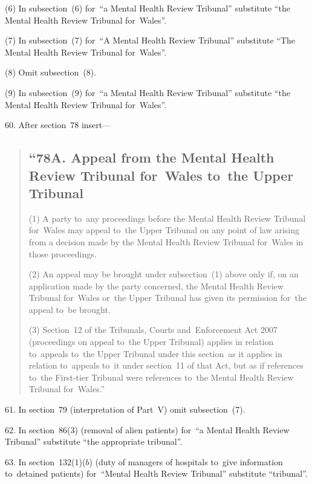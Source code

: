 \documentclass[12pt,a4paper]{article}
\begin{document}
(6) In subsection~(6) for~“a Mental Health Review Tribunal” substitute “the Mental Health Review Tribunal for~Wales”.

(7) In subsection~(7) for~“A Mental Health Review Tribunal” substitute “The Mental Health Review Tribunal for~Wales”.

(8) Omit subsection~(8).

(9) In subsection~(9) for~“a Mental Health Review Tribunal” substitute “the Mental Health Review Tribunal for~Wales”.

\medskip

60.  After section~78 insert—
\begin{quotation}
\subsection*{“78A. Appeal from the Mental Health Review Tribunal for~Wales to~the Upper Tribunal}

(1)  A party to~any proceedings before the Mental Health Review Tribunal for~Wales may appeal to~the Upper Tribunal on any point of law arising from a decision made by the Mental Health Review Tribunal for~Wales in those proceedings.

(2) An appeal may be brought under subsection~(1) above only if, on an application made by the party concerned, the Mental Health Review Tribunal for~Wales or~the Upper Tribunal has given its permission for~the appeal to~be brought.

(3) Section~12 of the Tribunals, Courts and~Enforcement Act 2007 (proceedings on appeal to~the Upper Tribunal) applies in relation to~appeals to~the Upper Tribunal under this section~as it applies in relation to~appeals to~it under section~11 of that Act, but as if references to~the First-tier Tribunal were references to~the Mental Health Review Tribunal for~Wales.”
\end{quotation}

\medskip

61.  In section~79 (interpretation of Part~V) omit subsection~(7).

\medskip

62.  In section~86(3) (removal of alien patients) for~“a Mental Health Review Tribunal” substitute “the appropriate tribunal”.

\medskip

63.  In section~132(1)($b$)  (duty of managers of hospitals to~give information to~detained patients) for~“Mental Health Review Tribunal” substitute “tribunal”.
\end{document}
